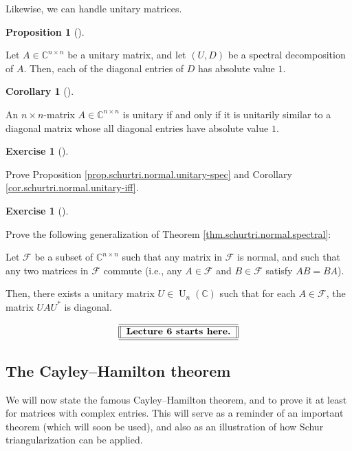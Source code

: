 \documentclass[numbers=enddot,12pt,final,onecolumn,notitlepage]{scrartcl}%
\newcounter{exer}
\numberwithin{exer}{subsection}
\theoremstyle{definition}
\newtheorem{prop}[theo]{Proposition}
\newenvironment{proposition}[1][]
{\begin{prop}[#1]\begin{leftbar}}
{\end{leftbar}\end{prop}}
\newtheorem{coro}[theo]{Corollary}
\newenvironment{corollary}[1][]
{\begin{coro}[#1]\begin{leftbar}}
{\end{leftbar}\end{coro}}
\newtheorem{exmp}[exer]{Exercise}
\newenvironment{exercise}[1][]
{\begin{exmp}[#1]\begin{leftbar}}
{\end{leftbar}\end{exmp}}
\begin{document}
Likewise, we can handle unitary matrices.

\begin{proposition}
\label{prop.schurtri.normal.unitary-spec}Let $A\in\mathbb{C}^{n\times n}$ be a
unitary matrix, and let $\left(  U,D\right)  $ be a spectral decomposition of
$A$. Then, each of the diagonal entries of $D$ has absolute value $1$.
\end{proposition}

\begin{corollary}
\label{cor.schurtri.normal.unitary-iff}An $n\times n$-matrix $A\in
\mathbb{C}^{n\times n}$ is unitary if and only if it is unitarily similar to a
diagonal matrix whose all diagonal entries have absolute value $1$.
\end{corollary}

\begin{exercise}
\label{exe.schurtri.normal.unitary} Prove Proposition
\ref{prop.schurtri.normal.unitary-spec} and Corollary
\ref{cor.schurtri.normal.unitary-iff}.
\end{exercise}

\begin{exercise}
 Prove the following generalization of Theorem
\ref{thm.schurtri.normal.spectral}:

Let $\mathcal{F}$ be a subset of $\mathbb{C}^{n\times n}$ such that any matrix
in $\mathcal{F}$ is normal, and such that any two matrices in $\mathcal{F}$
commute (i.e., any $A\in\mathcal{F}$ and $B\in\mathcal{F}$ satisfy $AB=BA$).

Then, there exists a unitary matrix $U\in\operatorname*{U}\nolimits_{n}\left(
\mathbb{C}\right)  $ such that for each $A\in\mathcal{F}$, the matrix
$UAU^{\ast}$ is diagonal.
\end{exercise}

%

\[%
\begin{tabular}
[c]{||l||}\hline\hline
\textbf{Lecture 6 starts here.}\\\hline\hline
\end{tabular}
\]


\subsection{The Cayley--Hamilton theorem}

We will now state the famous Cayley--Hamilton theorem, and to prove it at
least for matrices with complex entries. This will serve as a reminder of an
important theorem (which will soon be used), and also as an illustration of
how Schur triangularization can be applied.
\end{document}
